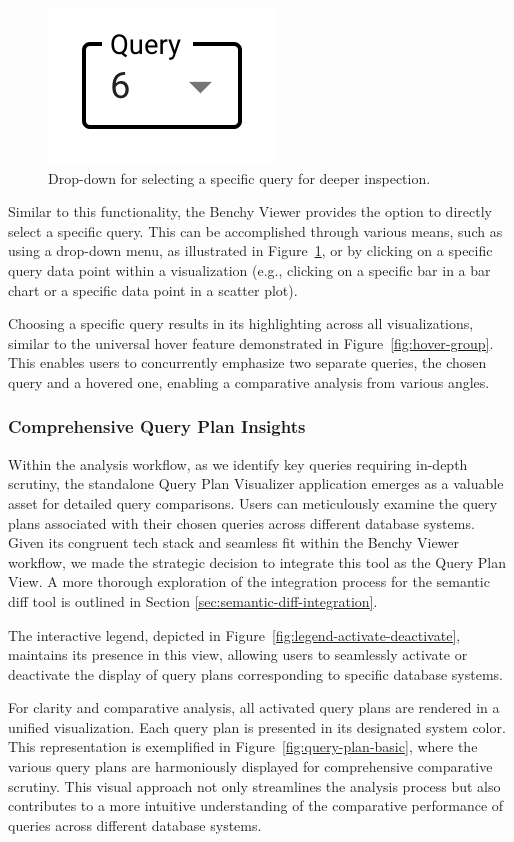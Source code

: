 \begin{figure}[h]
  \centering
  \includegraphics[width=0.15\linewidth]{figures/select-query.png}
  \caption{Drop-down for selecting a specific query for deeper inspection.}
  \label{fig:select-query}
\end{figure}

Similar to this functionality, the Benchy Viewer provides the option to directly select a specific query. This can be accomplished through various means, such as using a drop-down menu, as illustrated in Figure~\ref{fig:select-query}, or by clicking on a specific query data point within a visualization (e.g., clicking on a specific bar in a bar chart or a specific data point in a scatter plot).

Choosing a specific query results in its highlighting across all visualizations, similar to the universal hover feature demonstrated in Figure~\ref{fig:hover-group}. This enables users to concurrently emphasize two separate queries, the chosen query and a hovered one, enabling a comparative analysis from various angles.

\subsubsection{Comprehensive Query Plan Insights}

Within the analysis workflow, as we identify key queries requiring in-depth scrutiny, the standalone Query Plan Visualizer application \parencite*{semantic-diff} emerges as a valuable asset for detailed query comparisons. Users can meticulously examine the query plans associated with their chosen queries across different database systems. Given its congruent tech stack and seamless fit within the Benchy Viewer workflow, we made the strategic decision to integrate this tool as the Query Plan View. A more thorough exploration of the integration process for the semantic diff tool is outlined in Section \ref{sec:semantic-diff-integration}.

The interactive legend, depicted in Figure~\ref{fig:legend-activate-deactivate}, maintains its presence in this view, allowing users to seamlessly activate or deactivate the display of query plans corresponding to specific database systems.

For clarity and comparative analysis, all activated query plans are rendered in a unified visualization. Each query plan is presented in its designated system color. This representation is exemplified in Figure~\ref{fig:query-plan-basic}, where the various query plans are harmoniously displayed for comprehensive comparative scrutiny. This visual approach not only streamlines the analysis process but also contributes to a more intuitive understanding of the comparative performance of queries across different database systems.

